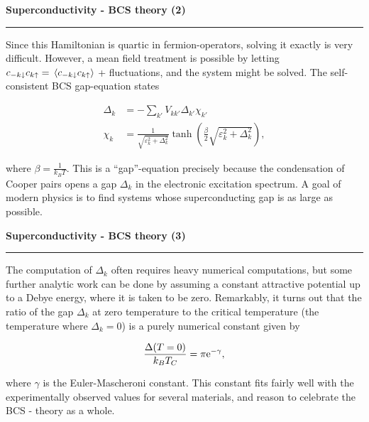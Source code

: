 \begin{frame}
	\begin{block}{\color{white}\textbf{\Large{
					Superconductivity - BCS theory (2)
		}}}
		\vspace{-10pt}\rule{\textwidth}{0.5pt}
		\color{white}
		Since this Hamiltonian is quartic in fermion-operators, solving it exactly is very difficult. However, a mean field treatment is possible by letting $c_{-k\downarrow}c_{k\uparrow} = \ev*{c_{-k\downarrow}c_{k\uparrow}}$ + fluctuations, and the system might be solved. The self-consistent BCS gap-equation states
		
	\end{block}
	{
			\begin{align*}
					\Delta_k &= -\sum_{k'}V_{kk'}\Delta_{k'}\chi_{k'} \\
					\chi_{k} &= \frac{1}{\sqrt{\varepsilon_k^2 + \Delta_k^2}}\tanh(\frac{\beta}{2}\sqrt{\varepsilon_k^2 + \Delta_k^2}),
			\end{align*}

	}
	
	\begin{block}{}
		\color{white}
		where $\beta = \frac{1}{k_BT}$.
		This is a ``gap''-equation precisely because the condensation of Cooper pairs opens a gap $\Delta_k$ in the electronic excitation spectrum. A goal of modern physics is to find systems whose superconducting gap is as large as possible. 
		
		
	\end{block}
	
	
\end{frame}


\begin{frame}
	\begin{block}{\color{white}\textbf{\Large{
					Superconductivity - BCS theory (3)
		}}}
		\vspace{-10pt}\rule{\textwidth}{0.5pt}
		\color{white}
		
		The computation of $\Delta_k$ often requires heavy numerical computations, but some further analytic work can be done by assuming a constant attractive potential up to a Debye energy, where it is taken to be zero. 
		Remarkably, it turns out that the ratio of the gap $\Delta_k$ at zero temperature to the critical temperature (the temperature where $\Delta_k = 0$) is a purely numerical constant given by
		
	\end{block}
	{
		\begin{equation*} 
			\frac{\Delta(T=0)}{k_B T_C} = \pi\mathrm{e}^{-\gamma}, 
		\end{equation*}
	}
	
	\begin{block}{}
		\color{white}
		where $\gamma$ is the Euler-Mascheroni constant. This constant fits fairly well with the experimentally observed values for several materials, and reason to celebrate the BCS - theory as a whole. 
		
		
	\end{block}
	
	
\end{frame}